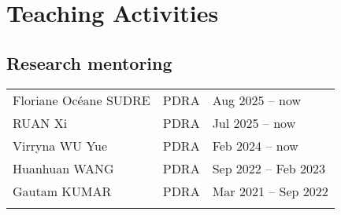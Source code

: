 \documentclass[letterpaper]{article}
\renewenvironment{itemize}{
  \begin{list}{}{
    \setlength{\leftmargin}{1.5em}
  }
}{
  \end{list}
}
\begin{document}






\section*{Teaching Activities}

\subsection*{Research mentoring}

\begin{tabularx}{\textwidth}{XXX}
  Floriane Oc\'eane SUDRE & PDRA  & Aug 2025 -- now\\
  RUAN Xi                 & PDRA  & Jul 2025 -- now\\
  Virryna WU Yue          & PDRA  & Feb 2024 -- now\\
  Huanhuan WANG           & PDRA  & Sep 2022 -- Feb 2023\\
  Gautam KUMAR            & PDRA  & Mar 2021 -- Sep 2022\\
  \\
\end{tabularx}
\end{document}
